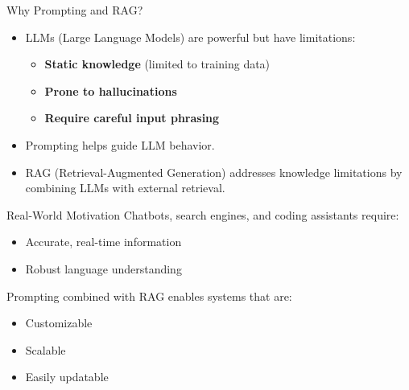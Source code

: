 \begin{frame}[t]{Why Prompting and RAG?}
  \begin{itemize}
    \item LLMs (Large Language Models) are powerful but have limitations:
    \begin{itemize}
      \item[\textcolor{red}{$\blacktriangleright$}] \textbf{Static knowledge} (limited to training data)
      \item[\textcolor{red}{$\blacktriangleright$}] \textbf{Prone to hallucinations}
      \item[\textcolor{red}{$\blacktriangleright$}] \textbf{Require careful input phrasing}
    \end{itemize}
    \vspace{1em}
    \item Prompting helps guide LLM behavior.
    \vspace{1em}
    \item RAG (Retrieval-Augmented Generation) addresses knowledge limitations by combining LLMs with external retrieval.
  \end{itemize}
\end{frame}

\begin{frame}{Real-World Motivation}
  Chatbots, search engines, and coding assistants require:
  \begin{itemize}
    \item[\textcolor{red}{$\blacktriangleright$}] Accurate, real-time information
    \item[\textcolor{red}{$\blacktriangleright$}] Robust language understanding
  \end{itemize}

  \vspace{1em}
  Prompting combined with RAG enables systems that are:
  \begin{itemize}
    \item[\textcolor{red}{$\blacktriangleright$}] Customizable
    \item[\textcolor{red}{$\blacktriangleright$}] Scalable
    \item[\textcolor{red}{$\blacktriangleright$}] Easily updatable
  \end{itemize}
\end{frame}
